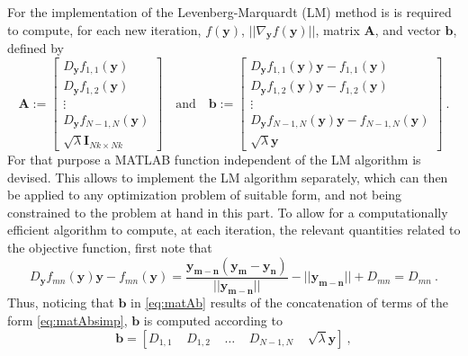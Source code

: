 \documentclass[12pt]{article}
\begin{document}
For the implementation of the Levenberg-Marquardt (LM) method is is required to compute, for each new iteration, $f(\mathbf{y})$, $||\nabla_{\mathbf{y}} f(\mathbf{y})||$, matrix $\mathbf{A}$, and vector $\mathbf{b}$, defined by
\begin{equation}\label{eq:matAb}
\mathbf{A}:= \begin{bmatrix}
D_{\mathbf{y}} f_{1,1}(\mathbf{y})\\
D_{\mathbf{y}} f_{1,2}(\mathbf{y})\\\vdots\\
D_{\mathbf{y}} f_{N-1,N}(\mathbf{y})\\
\sqrt{\lambda}\mathbf{I}_{Nk\times Nk}
\end{bmatrix}\quad \text{and} \quad \mathbf{b}:= \begin{bmatrix}
D_{\mathbf{y}} f_{1,1}(\mathbf{y})\mathbf{y}-f_{1,1}(\mathbf{y})\\
D_{\mathbf{y}} f_{1,2}(\mathbf{y})\mathbf{y}-f_{1,2}(\mathbf{y})\\\vdots\\
D_{\mathbf{y}} f_{N-1,N}(\mathbf{y})\mathbf{y}-f_{N-1,N}(\mathbf{y})\\
\sqrt{\lambda}\mathbf{y}
\end{bmatrix}\:.
\end{equation}
For that purpose a MATLAB function independent of the LM algorithm is devised. This allows to implement the LM algorithm separately, which can then be applied to any optimization problem of suitable form, and not being constrained to the problem at hand in this part. To allow for a computationally efficient algorithm to compute, at each iteration, the relevant quantities related to the objective function, first note that 
\begin{equation}\label{eq:matAbsimp}
D_{\mathbf{y}} f_{mn}(\mathbf{y})\mathbf{y}-f_{mn}(\mathbf{y}) = \frac{\mathbf{y_{m-n}}(\mathbf{y_m}-\mathbf{y_n})}{||\mathbf{y_{m-n}}||}-||\mathbf{y_{m-n}}||+D_{mn} = D_{mn}\:.
\end{equation}
Thus, noticing that $\mathbf{b}$ in \eqref{eq:matAb} results of the concatenation of terms of the form \eqref{eq:matAbsimp}, $\mathbf{b}$ is computed according to
\begin{equation}\label{eq:b}
\mathbf{b}= \left[D_{1,1}\;\;\;\;D_{1,2}\;\;\;\;\ldots \;\;\;\;D_{N-1,N}\;\;\;\; \sqrt{\lambda}\mathbf{y} \right]\:,
\end{equation}
\end{document}

